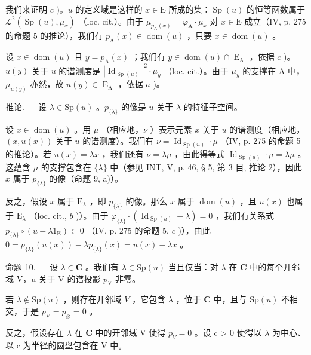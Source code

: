我们来证明 \(c\) )。\(u\) 的定义域是这样的 \(x \in \mathrm{E}\) 所成的集：\(\operatorname{Sp}(u)\) 的恒等函数属于 \(\mathcal{L}^2(\operatorname{Sp}(u), \mu_x)\) （loc. cit.）。由于 \(\mu_{p_{\mathrm{A}}(x)} = \varphi_{\mathrm{A}} \cdot \mu_x\) 对 \(x \in \mathrm{E}\) 成立（IV, p. 275 的命题 5 的推论），我们有 \(p_{\mathrm{A}}(x) \in \operatorname{dom}(u)\) ，只要 \(x \in \operatorname{dom}(u)\) 。

设 \(x \in \operatorname{dom}(u)\) 且 \(y = p_{\operatorname{A}}(x)\) ；我们有 \(y \in \operatorname{dom}(u) \cap \operatorname{E}_{\operatorname{A}}\) ，依据 \(c\) )。\(u(y)\) 关于 \(u\) 的谱测度是 \(|\operatorname{Id}_{\operatorname{Sp}(u)}|^2 \cdot \mu_y\) （loc. cit.）。由于 \(\mu_y\) 的支撑在 A 中，\(\mu_{u(y)}\) 亦然，故 \(u(y) \in \operatorname{E}_{\operatorname{A}}\) ，依据 \(a\) )。

推论. --- 设 \(\lambda \in \mathrm{Sp}(u)\) 。\(p_{\{\lambda\}}\) 的像是 \(u\) 关于 \(\lambda\) 的特征子空间。

设 \(x \in \operatorname{dom}(u)\) 。用 \(\mu\) （相应地，\(\nu\) ）表示元素 \(x\) 关于 \(u\) 的谱测度（相应地，\((x, u(x))\) 关于 \(u\) 的谱测度）。我们有 \(\nu = \operatorname{Id}_{\operatorname{Sp}(u)} \cdot \mu\) （IV, p. 275 的命题 5 的推论）。若 \(u(x) = \lambda x\) ，我们还有 \(\nu = \lambda \mu\) ，由此得等式 \(\operatorname{Id}_{\operatorname{Sp}(u)} \cdot \mu = \lambda \mu\) 。这蕴含 \(\mu\) 的支撑包含在 \(\{\lambda\}\) 中（参见 INT, V, p. 46, § 5, 第 3 目, 推论 2），因此 \(x\) 属于 \(p_{\{\lambda\}}\) 的像（命题 9, a)）。

反之，假设 \(x\) 属于 \(\mathrm{E}_{\lambda}\) ，即 \(p_{\{\lambda\}}\) 的像。那么 \(x\) 属于 \(\operatorname{dom}(u)\) ，且 \(u(x)\) 也属于 \(\mathrm{E}_{\lambda}\) （loc. cit., \(b\) )）。由于 \(\varphi_{\{\lambda\}} \cdot (\operatorname{Id}_{\operatorname{Sp}(u)} - \lambda) = 0\) ，我们有关系式 \(p_{\{\lambda\}} \circ (u - \lambda 1_{\mathrm{E}}) \subset 0\) （IV, p. 275 的命题 5, \(c\) )），由此 \(0 = p_{\{\lambda\}}(u(x)) - \lambda p_{\{\lambda\}}(x) = u(x) - \lambda x\) 。

命题 10. — 设 \(\lambda \in \mathbf{C}\) 。我们有 \(\lambda \in \mathrm{Sp}(u)\) 当且仅当：对 \(\lambda\) 在 \(\mathbf{C}\) 中的每个开邻域 V，u 关于 V 的谱投影 \(p_{\mathrm{V}}\) 非零。

若 \(\lambda \notin \mathrm{Sp}(u)\) ，则存在开邻域 \(V\) ，它包含 \(\lambda\) ，位于 \(\mathbf{C}\) 中，且与 \(\mathrm{Sp}(u)\) 不相交，于是 \(p_{\mathrm{V}} = p_{\varnothing} = 0\) 。

反之，假设存在 \(\lambda\) 在 \(\mathbf{C}\) 中的开邻域 V 使得 \(p_{V} = 0\) 。设 c > 0 使得以 \(\lambda\) 为中心、以 c 为半径的圆盘包含在 V 中。

